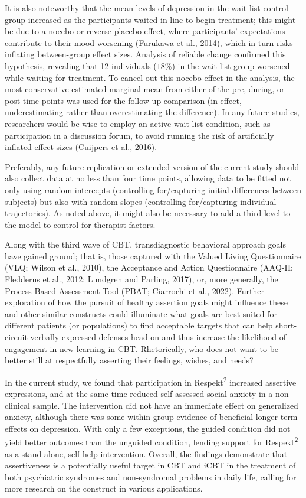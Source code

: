 \documentclass[3p]{elsarticle} %
\begin{document}
It is also noteworthy that the mean levels of depression in the
wait-list control group increased as the participants waited in line to
begin treatment; this might be due to a nocebo or reverse placebo
effect, where participants' expectations contribute to their mood
worsening (Furukawa et al., 2014), which in turn risks inflating
between-group effect sizes. Analysis of reliable change confirmed this
hypothesis, revealing that 12 individuals (\(18\)\%) in the wait-list
group worsened while waiting for treatment. To cancel out this nocebo
effect in the analysis, the most conservative estimated marginal mean
from either of the pre, during, or post time points was used for the
follow-up comparison (in effect, underestimating rather than
overestimating the difference). In any future studies, researchers would
be wise to employ an active wait-list condition, such as participation
in a discussion forum, to avoid running the risk of artificially
inflated effect sizes (Cuijpers et al., 2016).

Preferably, any future replication or extended version of the current
study should also collect data at no less than four time points,
allowing data to be fitted not only using random intercepts (controlling
for/capturing initial differences between subjects) but also with random
slopes (controlling for/capturing individual trajectories). As noted
above, it might also be necessary to add a third level to the model to
control for therapist factors.

Along with the third wave of CBT, transdiagnostic behavioral approach
goals have gained ground; that is, those captured with the Valued Living
Questionnaire (VLQ; Wilson et al., 2010), the Acceptance and Action
Questionnaire (AAQ-II; Fledderus et al., 2012; Lundgren and Parling,
2017), or, more generally, the Process-Based Assessment Tool (PBAT;
Ciarrochi et al., 2022). Further exploration of how the pursuit of
healthy assertion goals might influence these and other similar
constructs could illuminate what goals are best suited for different
patients (or populations) to find acceptable targets that can help
short-circuit verbally expressed defenses head-on and thus increase the
likelihood of engagement in new learning in CBT. Rhetorically, who does
not want to be better still at respectfully asserting their feelings,
wishes, and needs?

In the current study, we found that participation in
Respekt\textsuperscript{2} increased assertive expressions, and at the
same time reduced self-assessed social anxiety in a non-clinical sample.
The intervention did not have an immediate effect on generalized
anxiety, although there was some within-group evidence of beneficial
longer-term effects on depression. With only a few exceptions, the
guided condition did not yield better outcomes than the unguided
condition, lending support for Respekt\textsuperscript{2} as a
stand-alone, self-help intervention. Overall, the findings demonstrate
that assertiveness is a potentially useful target in CBT and iCBT in the
treatment of both psychiatric syndromes and non-syndromal problems in
daily life, calling for more research on the construct in various
applications.
\end{document}

